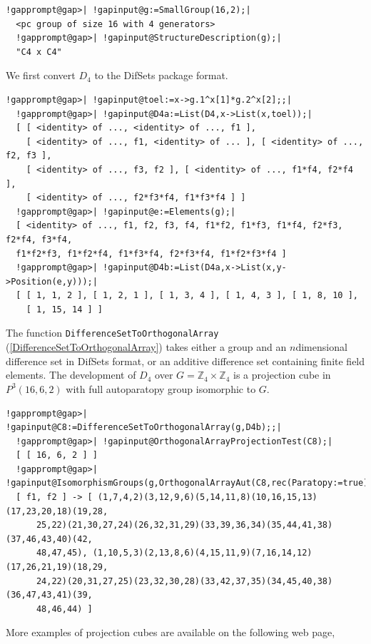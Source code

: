 \documentclass[a4paper,11pt]{report}
\begin{document}
{{\begin{Verbatim}[commandchars=!@|,fontsize=\small,frame=single,label=Example]
  !gapprompt@gap>| !gapinput@g:=SmallGroup(16,2);|
  <pc group of size 16 with 4 generators>
  !gapprompt@gap>| !gapinput@StructureDescription(g);|
  "C4 x C4"
\end{Verbatim}
 We first convert $D_4$ to the \textsf{DifSets} package format. 
\begin{Verbatim}[commandchars=!@|,fontsize=\small,frame=single,label=Example]
  !gapprompt@gap>| !gapinput@toel:=x->g.1^x[1]*g.2^x[2];;|
  !gapprompt@gap>| !gapinput@D4a:=List(D4,x->List(x,toel));|
  [ [ <identity> of ..., <identity> of ..., f1 ], 
    [ <identity> of ..., f1, <identity> of ... ], [ <identity> of ..., f2, f3 ], 
    [ <identity> of ..., f3, f2 ], [ <identity> of ..., f1*f4, f2*f4 ], 
    [ <identity> of ..., f2*f3*f4, f1*f3*f4 ] ]
  !gapprompt@gap>| !gapinput@e:=Elements(g);|
  [ <identity> of ..., f1, f2, f3, f4, f1*f2, f1*f3, f1*f4, f2*f3, f2*f4, f3*f4, 
  f1*f2*f3, f1*f2*f4, f1*f3*f4, f2*f3*f4, f1*f2*f3*f4 ]
  !gapprompt@gap>| !gapinput@D4b:=List(D4a,x->List(x,y->Position(e,y)));|
  [ [ 1, 1, 2 ], [ 1, 2, 1 ], [ 1, 3, 4 ], [ 1, 4, 3 ], [ 1, 8, 10 ], 
    [ 1, 15, 14 ] ]
\end{Verbatim}
 The function \texttt{DifferenceSetToOrthogonalArray} (\ref{DifferenceSetToOrthogonalArray}) takes either a group and an $n$\texttt{}dimensional difference set in \textsf{DifSets} format, or an additive difference set containing finite field elements. The
development of $D_4$ over $G=\mathbb{Z}_4\times \mathbb{Z}_4$ is a projection cube in $P^3(16,6,2)$ with full autoparatopy group isomorphic to $G$. 
\begin{Verbatim}[commandchars=!@|,fontsize=\small,frame=single,label=Example]
  !gapprompt@gap>| !gapinput@C8:=DifferenceSetToOrthogonalArray(g,D4b);;|
  !gapprompt@gap>| !gapinput@OrthogonalArrayProjectionTest(C8);|
  [ [ 16, 6, 2 ] ]
  !gapprompt@gap>| !gapinput@IsomorphismGroups(g,OrthogonalArrayAut(C8,rec(Paratopy:=true)));|
  [ f1, f2 ] -> [ (1,7,4,2)(3,12,9,6)(5,14,11,8)(10,16,15,13)(17,23,20,18)(19,28,
      25,22)(21,30,27,24)(26,32,31,29)(33,39,36,34)(35,44,41,38)(37,46,43,40)(42,
      48,47,45), (1,10,5,3)(2,13,8,6)(4,15,11,9)(7,16,14,12)(17,26,21,19)(18,29,
      24,22)(20,31,27,25)(23,32,30,28)(33,42,37,35)(34,45,40,38)(36,47,43,41)(39,
      48,46,44) ]
\end{Verbatim}
 More examples of projection cubes are available on the following web page, 

}}
\end{document}
